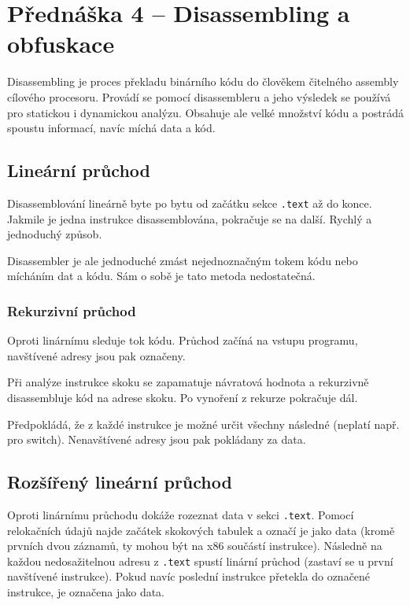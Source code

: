 \section{Přednáška 4 -- Disassembling a obfuskace}

Disassembling je proces překladu binárního kódu do člověkem čitelného assembly cílového procesoru.
Provádí se pomocí disassembleru a jeho výsledek se používá pro statickou i dynamickou analýzu.
Obsahuje ale velké množství kódu a postrádá spoustu informací, navíc míchá data a kód.

\subsection*{Lineární průchod}

Disassemblování lineárně byte po bytu od začátku sekce \texttt{.text} až do konce.
Jakmile je jedna instrukce disassemblována, pokračuje se na další.
Rychlý a jednoduchý způsob.

Disassembler je ale jednoduché zmást nejednoznačným tokem kódu nebo mícháním dat a kódu.
Sám o sobě je tato metoda nedostatečná.

\subsubsection*{Rekurzivní průchod}

Oproti linárnímu sleduje tok kódu.
Průchod začíná na vstupu programu, navštívené adresy jsou pak označeny.

Při analýze instrukce skoku se zapamatuje návratová hodnota a rekurzivně disassembluje kód na adrese skoku.
Po vynoření z rekurze pokračuje dál.

Předpokládá, že z každé instrukce je možné určit všechny následné (neplatí např. pro switch).
Nenavštívené adresy jsou pak pokládany za data.

\subsection*{Rozšířený lineární průchod}

Oproti linárnímu průchodu dokáže rozeznat data v sekci \texttt{.text}.
Pomocí relokačních údajů najde začátek skokových tabulek a označí je jako data (kromě prvních dvou záznamů, ty mohou být na x86 součástí instrukce).
Následně na každou nedosažitelnou adresu z \texttt{.text} spustí linární průchod (zastaví se u první navštívené instrukce).
Pokud navíc poslední instrukce přetekla do označené instrukce, je označena jako data.

